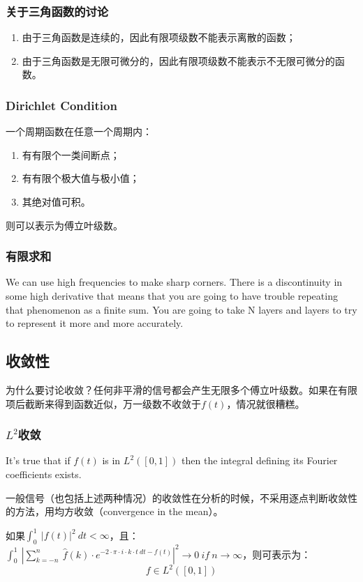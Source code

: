 \subsubsection{关于三角函数的讨论}
\begin{enumerate}
	\item 由于三角函数是连续的，因此有限项级数不能表示离散的函数；
	\item 由于三角函数是无限可微分的，因此有限项级数不能表示不无限可微分的函数。
\end{enumerate}


\subsubsection{Dirichlet Condition}
一个周期函数在任意一个周期内：
\begin{enumerate}
	\item 有有限个一类间断点；
	\item 有有限个极大值与极小值；
	\item 其绝对值可积。
\end{enumerate}

则可以表示为傅立叶级数。
\subsubsection{有限求和}
We can use high frequencies to make sharp corners. There is a discontinuity in some high derivative that means that you are going to have trouble repeating that phenomenon as a finite sum. You are going to take N layers and layers to try to represent it more and more accurately.
\subsection{收敛性}
为什么要讨论收敛？任何非平滑的信号都会产生无限多个傅立叶级数。如果在有限项后截断来得到函数近似，万一级数不收敛于$f(t)$，情况就很糟糕。
\subsubsection{$L^2$收敛}
It's true that if $f(t)$ is in $L^2 ([0, 1])$ then the integral deﬁning its Fourier coeﬃcients exists.

一般信号（也包括上述两种情况）的收敛性在分析的时候，不采用逐点判断收敛性的方法，用均方收敛（convergence in the mean）。

如果$\int_{0}^{1}\ |f(t)|^2\ dt<\infty$，且：$\int_{0}^{1}\ |\sum\limits_{k=-n}^{n}\ \hat{f}(k)\cdot e^{-2\cdot \pi\cdot i\cdot k\cdot t\ dt-f(t)}|^2\rightarrow 0\ if\ n\rightarrow \infty$，则可表示为：
$$
	f\in L^2([0,1])
$$
